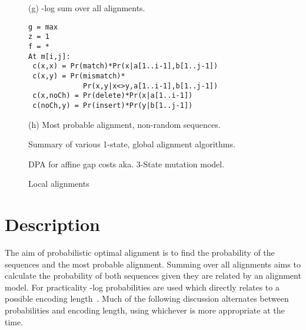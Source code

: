 \documentclass[a4paper,11pt,oneside]{article}
\begin{document}
\begin{figure}
\begin{minipage}{\textwidth}
\begin{multicols}{2}
(g) -log sum over all alignments.


\begin{verbatim}
g = max
z = 1
f = *
At m[i,j]:
 c(x,x) = Pr(match)*Pr(x|a[1..i-1],b[1..j-1])
 c(x,y) = Pr(mismatch)*
             Pr(x,y|x<>y,a[1..i-1],b[1..j-1])
 c(x,noCh) = Pr(delete)*Pr(x|a[1..i-1])
 c(noCh,y) = Pr(insert)*Pr(y|b[1..j-1])
\end{verbatim}

(h) Most probable alignment, non-random sequences.

\end{multicols}
\end{minipage}
\caption{\label{fig:algs}Summary of various 1-state, global alignment algorithms.}
\end{figure}

\begin{figure}
\begin{multicols}{2}

\centering
{}
\caption{\label{fig:3state}DPA for affine gap costs aka. 3-State mutation model.}

\pagebreak

\centering
{}
\caption{\label{fig:local}Local alignments}

\end{multicols}
\end{figure}


\section{Description}

The aim of probabilistic optimal alignment is to find the probability of the
sequences and the most probable alignment.  Summing over all alignments aims
to calculate the probability of both sequences given they are related by an
alignment model.  For practicality -log probabilities are used which directly
relates to a possible encoding length~\cite{shannon48}.  Much of the following
discussion alternates between probabilities and encoding length, using
whichever is more appropriate at the time.
\end{document}
